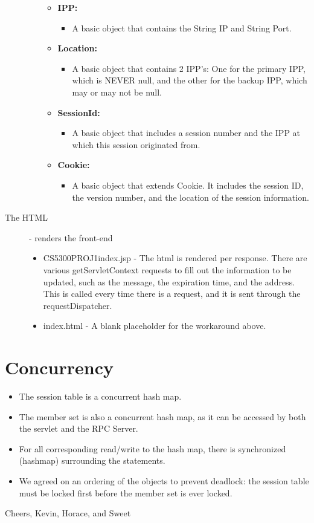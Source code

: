 \documentclass{article}
\begin{document}
\begin{description}
\begin{itemize}
\begin{itemize}
	    \item \textbf{IPP:}
		\begin{itemize}
		   \item A basic object that contains the String IP and String Port.
		\end{itemize}
	    \item \textbf{Location:}
		\begin{itemize}
		  \item A basic object that contains 2 IPP's: One for the primary IPP, which is NEVER null, and the other for the backup IPP, which may or may not be null.
		\end{itemize}
	    \item \textbf{SessionId:}
		\begin{itemize}
		  \item A basic object that includes a session number and the IPP at which this session originated from.
		\end{itemize}
	    \item \textbf{Cookie:}
		\begin {itemize}
		  \item A basic object that extends Cookie. It includes the session ID, the version number, and the location of the session information.
		\end {itemize}
          \end{itemize}    
      \end{itemize}
    \item[The HTML] - renders the front-end 
      \begin{itemize}
        \item CS5300PROJ1index.jsp - The html is rendered per response. There are various getServletContext requests to fill out the information to be updated, such as the message, the expiration time, and the address. This is called every time there is a request, and it is sent through the requestDispatcher.
        \item index.html - A blank placeholder for the workaround above.
      \end{itemize}

  \end{description}

\section{Concurrency}
  \begin{itemize}
    \item The session table is a concurrent hash map.
    \item The member set is also a concurrent hash map, as it can be accessed by both the servlet and the RPC Server.
    \item For all corresponding read/write to the hash map, there is synchronized (hashmap) surrounding the statements.
    \item We agreed on an ordering of the objects to prevent deadlock: the session table must be locked first before the member set is ever locked.
  \end{itemize}

Cheers, 
Kevin, Horace, and Sweet
\end{document}
